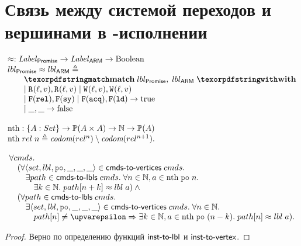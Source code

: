 \chapter{Связь между системой переходов и вершинами в \ARM-исполнении}
\label{sec:lts-rel}

\[\inarr{
  \approx : \Label_{\Promise} \rightarrow \Label_{\ARM} \rightarrow {\rm Boolean} \\
  lbl_{\Promise} \approx lbl_{\ARM} \defeq \\
  \qquad \kw{match} \; lbl_{\Promise}, \; lbl_{\ARM} \; \kw{with} \\
  \qquad
    \begin{array}{@{}l}
      | \; \rlab{}{\loc}{\val}, \rlab{}{\loc}{\val} \;
      | \; \wlab{}{\loc}{\val}, \wlab{}{\loc}{\val} \\
      | \; \flab{\rel}, \flab{\SY} \;
      | \; \flab{\acq}, \flab{\LD} \rightarrow {\rm true} \\
      | \; \_, \_ \rightarrow {\rm false}
    \end{array} \\
  \\
  \nthf : \{A : Set\} \rightarrow \Pset(A \times A) \rightarrow \mathbb{N} \rightarrow \Pset(A) \\
  \nthf \; rel \; n \defeq \codom{rel^{n}} \setminus \codom{rel^{n + 1}}.
}\]

\begin{theorem}
\[\inarr{
\forall \Carm. \\
\quad (\forall \tup{set, lbl, \lPO, \_, \_, \_} \in \cmdsToVrtxs \; \Carm. \\
\qquad \exists path \in \cmdsToLbls \; \Carm. \; \forall n \in \mathbb{N}, a \in \nthf \; \lPO \; n. \\
\qquad \quad \exists k \in \mathbb{N}. \; path[n + k] \approx lbl \; a) \land {} \\
\quad (\forall path \in \cmdsToLbls \; \Carm. \\
\qquad \exists \tup{set, lbl, \lPO, \_, \_, \_} \in \cmdsToVrtxs \; \Carm. \;
  \forall n \in \mathbb{N}. \\
\qquad \quad path[n] \neq \epsilon \Rightarrow \exists k \in \mathbb{N}, a \in \nthf \; \lPO \; (n - k). \; path[n] \approx lbl \; a).
}\]
\end{theorem}
\begin{proof}
  Верно по определению функций $\textup{\sf inst-to-lbl}$ и $\textup{\sf inst-to-vertex}$.
\end{proof}
